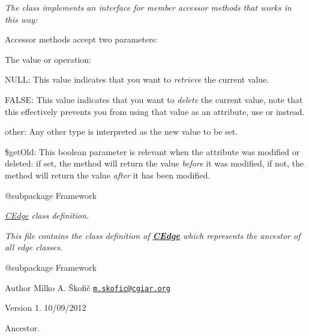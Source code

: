 {\itshape The class implements an interface for member accessor methods that works in this way\-:}

{\itshape 
\begin{DoxyItemize}
\item Accessor methods accept two parameters\-: 
\begin{DoxyItemize}
\item The value or operation\-: 
\begin{DoxyItemize}
\item {\ttfamily N\-U\-L\-L}\-: This value indicates that you want to {\itshape retrieve} the current value. 
\item {\ttfamily F\-A\-L\-S\-E}\-: This value indicates that you want to {\itshape delete} the current value, note that this effectively prevents you from using that value as an attribute, use {} or {} instead. 
\item other\-: Any other type is interpreted as the new value to be set. 
\end{DoxyItemize}
\item {\ttfamily \$get\-Old}\-: This boolean parameter is relevant when the attribute was modified or deleted\-: if set, the method will return the value {\itshape before} it was modified, if not, the method will return the value {\itshape after} it has been modified. 
\end{DoxyItemize}
\end{DoxyItemize}}

{\itshape \begin{DoxyVerb} @subpackage        Framework\end{DoxyVerb}
}

{\itshape {\itshape \hyperlink{class_c_edge}{C\-Edge}} class definition.}

{\itshape This file contains the class definition of {\bfseries \hyperlink{class_c_edge}{C\-Edge}} which represents the ancestor of all edge classes.}

{\itshape \begin{DoxyVerb} @subpackage        Framework
\end{DoxyVerb}
}

{\itshape \begin{DoxyAuthor}{Author}
Milko A. Škofič \href{mailto:m.skofic@cgiar.org}{\tt m.\-skofic@cgiar.\-org} 
\end{DoxyAuthor}
\begin{DoxyVersion}{Version}
1. 10/09/2012
\end{DoxyVersion}
Ancestor.}

